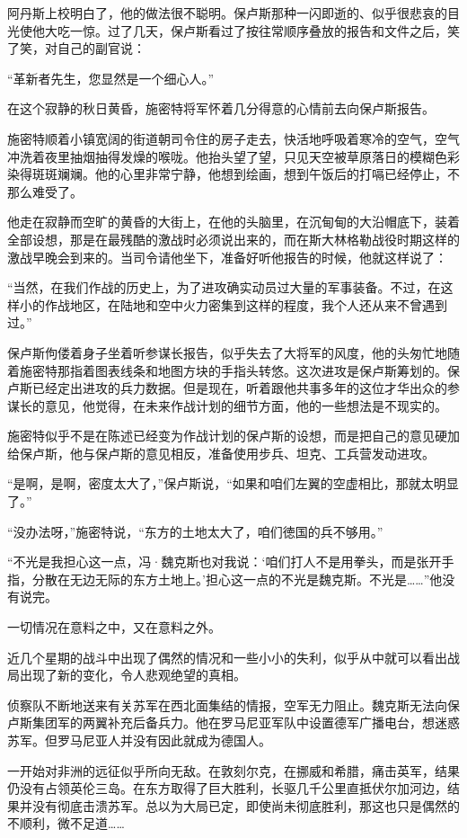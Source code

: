 阿丹斯上校明白了，他的做法很不聪明。保卢斯那种一闪即逝的、似乎很悲哀的目光使他大吃一惊。过了几天，保卢斯看过了按往常顺序叠放的报告和文件之后，笑了笑，对自己的副官说：

“革新者先生，您显然是一个细心人。”

在这个寂静的秋日黄昏，施密特将军怀着几分得意的心情前去向保卢斯报告。

施密特顺着小镇宽阔的街道朝司令住的房子走去，快活地呼吸着寒冷的空气，空气冲洗着夜里抽烟抽得发燥的喉咙。他抬头望了望，只见天空被草原落日的模糊色彩染得斑斑斓斓。他的心里非常宁静，他想到绘画，想到午饭后的打嗝已经停止，不那么难受了。

他走在寂静而空旷的黄昏的大街上，在他的头脑里，在沉甸甸的大沿帽底下，装着全部设想，那是在最残酷的激战时必须说出来的，而在斯大林格勒战役时期这样的激战早晚会到来的。当司令请他坐下，准备好听他报告的时候，他就这样说了：

“当然，在我们作战的历史上，为了进攻确实动员过大量的军事装备。不过，在这样小的作战地区，在陆地和空中火力密集到这样的程度，我个人还从来不曾遇到过。”

保卢斯佝偻着身子坐着听参谋长报告，似乎失去了大将军的风度，他的头匆忙地随着施密特那指着图表线条和地图方块的手指头转悠。这次进攻是保卢斯筹划的。保卢斯已经定出进攻的兵力数据。但是现在，听着跟他共事多年的这位才华出众的参谋长的意见，他觉得，在未来作战计划的细节方面，他的一些想法是不现实的。

施密特似乎不是在陈述已经变为作战计划的保卢斯的设想，而是把自己的意见硬加给保卢斯，他与保卢斯的意见相反，准备使用步兵、坦克、工兵营发动进攻。

“是啊，是啊，密度太大了，”保卢斯说，“如果和咱们左翼的空虚相比，那就太明显了。”

“没办法呀，”施密特说，“东方的土地太大了，咱们徳国的兵不够用。”

“不光是我担心这一点，冯·魏克斯也对我说：‘咱们打人不是用拳头，而是张开手指，分散在无边无际的东方土地上。’担心这一点的不光是魏克斯。不光是……”他没有说完。

一切情况在意料之中，又在意料之外。

近几个星期的战斗中出现了偶然的情况和一些小小的失利，似乎从中就可以看出战局出现了新的变化，令人悲观绝望的真相。

侦察队不断地送来有关苏军在西北面集结的情报，空军无力阻止。魏克斯无法向保卢斯集团军的两翼补充后备兵力。他在罗马尼亚军队中设置德军广播电台，想迷惑苏军。但罗马尼亚人并没有因此就成为德国人。

一开始对非洲的远征似乎所向无敌。在敦刻尔克，在挪威和希腊，痛击英军，结果仍没有占领英伦三岛。在东方取得了巨大胜利，长驱几千公里直抵伏尔加河边，结果并没有彻底击溃苏军。总以为大局已定，即使尚未彻底胜利，那这也只是偶然的不顺利，微不足道……

